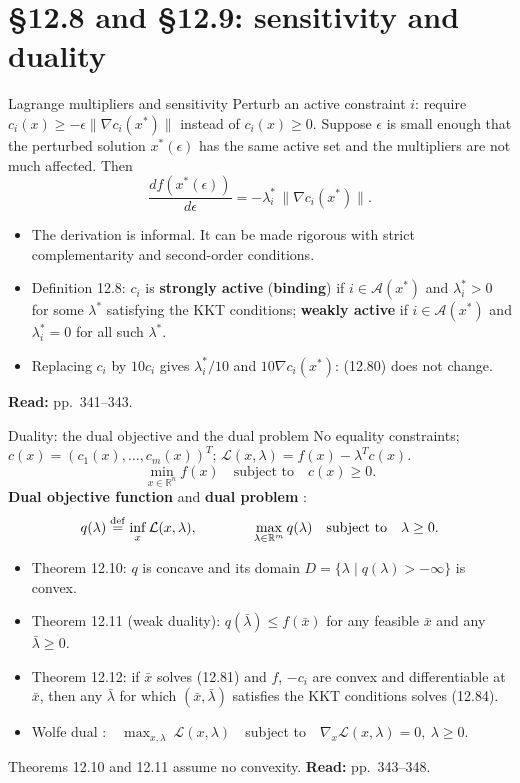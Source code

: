\documentclass[aspectratio=169,12pt]{beamer}
\newcommand{\R}{\mathbb{R}}
\newcommand{\xs}{x^{*}}
\newcommand{\eqn}[1]{\text{\small(#1)}}
\newcommand{\readbook}[1]{{\color{red}\textbf{Read:} #1}}
\newcommand{\ls}{\lambda^{*}}
\newcommand{\cA}{\mathcal{A}}
\newcommand{\cL}{\mathcal{L}}
\begin{document}
\section{\S12.8 and \S12.9: sensitivity and duality}

\begin{frame}{Lagrange multipliers and sensitivity}
  Perturb an active constraint $i$: require $c_{i}(x)\ge-\epsilon\|\nabla c_{i}(\xs)\|$ instead of
  $c_{i}(x)\ge 0$. Suppose $\epsilon$ is small enough that the perturbed solution $\xs(\epsilon)$ has
  the same active set and the multipliers are not much affected. Then
  \[ \frac{d f(\xs(\epsilon))}{d\epsilon}=-\ls_{i}\,\|\nabla c_{i}(\xs)\| . \tag{12.80} \]
  \begin{itemize}\setlength\itemsep{0.25em}
    \item The derivation is informal. It can be made rigorous with strict complementarity and
      second-order conditions.
    \item Definition 12.8: $c_{i}$ is \textbf{strongly active} (\textbf{binding}) if $i\in\cA(\xs)$ and
      $\ls_{i}>0$ for some $\ls$ satisfying the KKT conditions; \textbf{weakly active} if $i\in\cA(\xs)$ and
      $\ls_{i}=0$ for all such $\ls$.
    \item Replacing $c_{i}$ by $10c_{i}$ gives $\ls_{i}/10$ and $10\nabla c_{i}(\xs)$:
      (12.80) does not change.
  \end{itemize}
  \readbook{pp.~341--343.}
\end{frame}

\begin{frame}{Duality: the dual objective and the dual problem}
  No equality constraints; $c(x)=(c_{1}(x),\dots,c_{m}(x))^{T}$; $\cL(x,\lambda)=f(x)-\lambda^{T}c(x)$.
  \[ \min_{x\in\R^{n}} f(x)\quad\text{subject to}\quad c(x)\ge 0 . \tag{12.81} \]
  \textbf{Dual objective function} \eqn{12.82} and \textbf{dual problem} \eqn{12.84}:
  \[ q(\lambda)\stackrel{\rm def}{=}\inf_{x}\cL(x,\lambda),\qquad\qquad
     \max_{\lambda\in\R^{m}} q(\lambda)\quad\text{subject to}\quad\lambda\ge 0 . \]
  \begin{itemize}\setlength\itemsep{0.3em}
    \item Theorem 12.10: $q$ is concave and its domain $D=\{\lambda\mid q(\lambda)>-\infty\}$ is convex.
    \item Theorem 12.11 (weak duality): $q(\bar\lambda)\le f(\bar x)$ for any feasible $\bar x$ and any
      $\bar\lambda\ge 0$.
    \item Theorem 12.12: if $\bar x$ solves (12.81) and $f$, $-c_{i}$ are convex and differentiable at $\bar x$,
      then any $\bar\lambda$ for which $(\bar x,\bar\lambda)$ satisfies the KKT conditions solves (12.84).
    \item Wolfe dual \eqn{12.88}:\ \
      $\max_{x,\lambda}\ \cL(x,\lambda)$\ \ subject to\ \ $\nabla_{x}\cL(x,\lambda)=0,\ \lambda\ge 0$.
  \end{itemize}
  Theorems 12.10 and 12.11 assume no convexity. \readbook{pp.~343--348.}
\end{frame}
\end{document}
